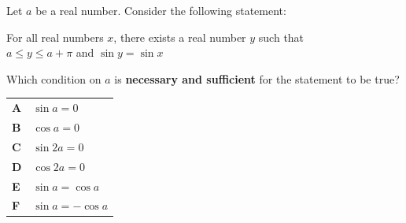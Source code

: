 \documentclass[11pt,a4paper]{article}
\begin{document}
\clearpage
\thispagestyle{djspaper}
\vspace*{8pt}
\begin{enumerate}[label=\textbf{\arabic*.},leftmargin=*,itemsep=0pt,start=17]
\questionitem[Logic]
Let $a$ be a real number. Consider the following statement:

\begin{center}
\begin{minipage}{0.8\textwidth}
\centering
For all real numbers $x$, there exists a real number $y$ such that\\

$a\le y\le a+\pi$ and $\sin y=\sin x$
\end{minipage}
\end{center}

Which condition on $a$ is \textbf{necessary and sufficient} for the statement to be true?

\par\vspace*{12pt}
\begin{tabularx}{\linewidth}{@{}>{\bfseries}l Y@{}}
A &
$\sin a=0$
\\[0.8em]
B &
$\cos a=0$
\\[0.8em]
C &
$\sin 2a=0$
\\[0.8em]
D &
$\cos 2a=0$
\\[0.8em]
E &
$\sin a=\cos a$
\\[0.8em]
F &
$\sin a=-\cos a$
\\
\end{tabularx}
\end{enumerate}
\clearpage
\thispagestyle{djspaper}
\vspace*{8pt}
\end{document}

